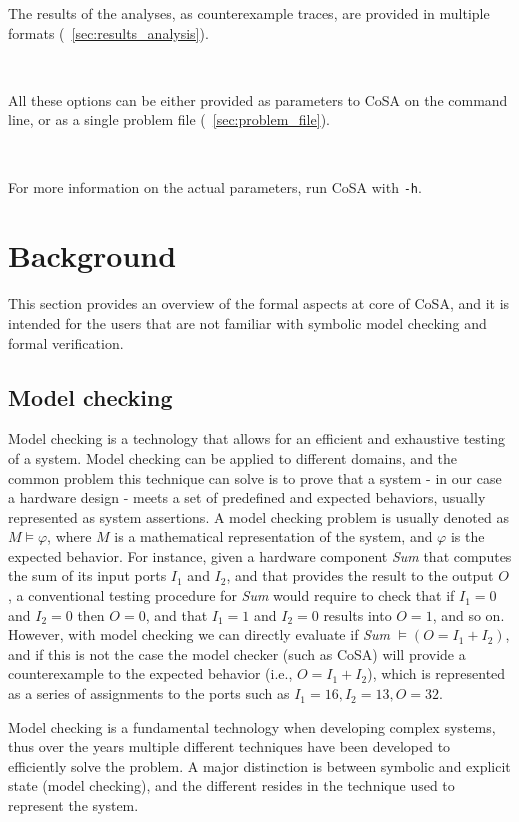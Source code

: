\documentclass{article}
\theoremstyle{definition}
\begin{document}
\noindent
The results of the analyses, as counterexample traces, are provided in
multiple formats (\textsection~\ref{sec:results_analysis}).

\

\noindent
All these options can be either provided as parameters to CoSA on the
command line, or as a single problem file
(\textsection~\ref{sec:problem_file}).

\

\noindent
For more information on the actual parameters, run CoSA with
\texttt{-h}.


\section{Background}
This section provides an overview of the formal aspects at core of
CoSA, and it is intended for the users that are not familiar with
symbolic model checking and formal verification.

\subsection{Model checking}
\label{sec:model_checking}
Model checking is a technology that allows for an efficient and
exhaustive testing of a system. Model checking can be applied to
different domains, and the common problem this technique can solve is
to prove that a system - in our case a hardware design - meets a set
of predefined and expected behaviors, usually represented as system
assertions. A model checking problem is usually denoted as $M \models
\varphi$, where $M$ is a mathematical representation of the system,
and $\varphi$ is the expected behavior. For instance, given a hardware
component \emph{Sum} that computes the sum of its input ports $I_1$
and $I_2$, and that provides the result to the output $O$, a
conventional testing procedure for \emph{Sum} would require to check
that if $I_1=0$ and $I_2=0$ then $O=0$, and that $I_1=1$ and $I_2=0$
results into $O=1$, and so on. However, with model checking we can
directly evaluate if \emph{Sum} $ \models (O=I_1+I_2)$, and if this is
not the case the model checker (such as CoSA) will provide a
counterexample to the expected behavior (i.e., $O=I_1+I_2$), which is
represented as a series of assignments to the ports such as $I_1=16,
I_2=13, O=32$.

Model checking is a fundamental technology when developing complex
systems, thus over the years multiple different techniques have been
developed to efficiently solve the problem. A major distinction is
between symbolic and explicit state (model checking), and the
different resides in the technique used to represent the system. 
\end{document}
